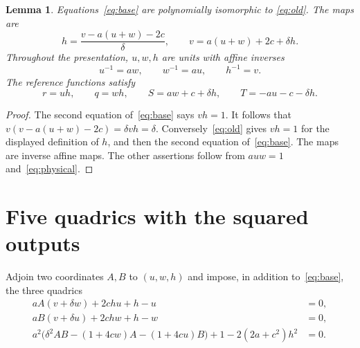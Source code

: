 \documentclass[11pt,a4paper]{article}
\newtheorem{lemma}[theorem]{Lemma}
\begin{document}
\begin{lemma}\label{lem:base}
Equations~\eqref{eq:base} are polynomially isomorphic to
\eqref{eq:old}. The maps are
\[
 h=\frac{v-a(u+w)-2c}{\delta},\qquad
 v=a(u+w)+2c+\delta h.
\]
Throughout the presentation, $u,w,h$ are units with affine inverses
\begin{equation}\label{eq:inverses}
 u^{-1}=aw,\qquad w^{-1}=au,\qquad h^{-1}=v.
\end{equation}
The reference functions satisfy
\begin{equation}\label{eq:outputs}
 r=uh,\qquad q=wh,\qquad
 S=aw+c+\delta h,\qquad T=-au-c-\delta h.
\end{equation}
\end{lemma}
\begin{proof}
The second equation of~\eqref{eq:base} says $vh=1$.
It follows that $v(v-a(u+w)-2c)=\delta vh=\delta$.
Conversely~\eqref{eq:old} gives $vh=1$ for the displayed definition
of $h$, and then the second equation of~\eqref{eq:base}.
The maps are inverse affine maps. The other assertions follow
from $auw=1$ and~\eqref{eq:physical}.
\end{proof}

\section{Five quadrics with the squared outputs}
Adjoin two coordinates $A,B$ to $(u,w,h)$ and impose, in addition
to~\eqref{eq:base}, the three quadrics
\begin{align}
 aA(v+\delta w)+2chu+h-u&=0,\label{eq:graphA}\\
 aB(v+\delta u)+2chw+h-w&=0,\label{eq:graphB}\\
 a^2\bigl(\delta^2AB-(1+4cw)A-(1+4cu)B\bigr)
       +1-2(2a+c^2)h^2&=0.\label{eq:patch}
\end{align}
\end{document}
